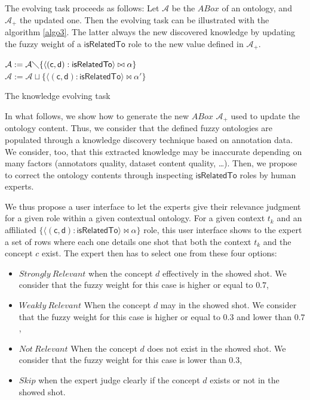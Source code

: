 		The evolving task proceeds as follows: Let $\mathcal{A}$ be the $ABox$ of an ontology, and $\mathcal{A_{+}}$ 
		the updated one. %
 		Then the evolving task can be illustrated with the algorithm \ref{algo3}. The latter always 
		the new discovered knowledge by updating the fuzzy weight of a $\mathsf{isRelatedTo}$ 
		role to the new value defined in $\mathcal{A_{+}}$.
		
		\begin{algorithm}
				
					{
					 $\mathcal{A} := \mathcal{A}  \diagdown \{
					 \langle{}(\mathsf{c},\mathsf{d}):
							\mathsf{isRelatedTo}\rangle{} \bowtie \alpha\}$\\
					$\mathcal{A} := \mathcal{A} \sqcup \{ \langle{}(\mathsf{c},\mathsf{d}):
							\mathsf{isRelatedTo}\rangle{} \bowtie \alpha'\}$\\
					}
				\caption{The knowledge evolving task}
				\label{algo3}
		\end{algorithm}

		In what follows, we show how to generate the new $ABox$ $\mathcal{A_{+}}$ used to update the ontology content. 
		Thus, we consider that the defined fuzzy ontologies are populated through
		a knowledge discovery technique based 
		on annotation data. We consider, too, that this extracted knowledge may
 		be inaccurate depending on many factors (annotators quality, dataset content quality, \dots). 
		Then, we propose  to correct the ontology contents 
		through inspecting $\mathsf{isRelatedTo}$ roles by human experts. 

		We thus propose a user interface to let the experts give their relevance judgment for a given role within a given 			contextual ontology. For a given context $t_{k}$ and an affiliated $\{ \langle{}(\mathsf{c},\mathsf{d}): 
		\mathsf{isRelatedTo}\rangle{} \bowtie \alpha\}$ role, this user interface shows
 		to the expert a set of rows where each one details one shot that both the context 
		$t_{k}$ and the concept $c$ exist. The expert then has to select one from these four options:
		\begin{itemize}
			\item $Strongly~Relevant$ when the concept $d$ effectively in the showed shot. We 
				consider that the fuzzy weight for this case is higher or equal to $0.7$,
			\item $Weakly~Relevant$ When the concept $d$ may  in the showed shot. We 
				consider that the fuzzy weight for this case is higher or equal to $0.3$ 
				and lower than $0.7$,
			\item $Not~Relevant$ When the concept $d$ does not exist in the showed shot. We 
				consider that the fuzzy weight for this case is lower than $0.3$,
			\item $Skip$ when the expert  judge clearly if the concept $d$ 
				exists or not in the showed shot.
		\end{itemize} 
		
